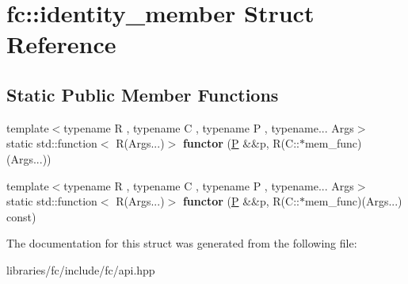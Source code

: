 \hypertarget{structfc_1_1identity__member}{}\section{fc\+:\+:identity\+\_\+member Struct Reference}
\label{structfc_1_1identity__member}
\subsection*{Static Public Member Functions}
\begin{DoxyCompactItemize}
\item 
\mbox{\label{structfc_1_1identity__member_a81c6dedaa5bfdc544e8699e746391e53}} 
{\footnotesize template$<$typename R , typename C , typename P , typename... Args$>$ }\\static std\+::function$<$ R(Args...)$>$ {\bfseries functor} (\mbox{\hyperlink{struct_p}{P}} \&\&p, R(C\+::$\ast$mem\+\_\+func)(Args...))
\item 
\mbox{\label{structfc_1_1identity__member_a07ab396b3fee76e30cfca9ed79e40848}} 
{\footnotesize template$<$typename R , typename C , typename P , typename... Args$>$ }\\static std\+::function$<$ R(Args...)$>$ {\bfseries functor} (\mbox{\hyperlink{struct_p}{P}} \&\&p, R(C\+::$\ast$mem\+\_\+func)(Args...) const)
\end{DoxyCompactItemize}


The documentation for this struct was generated from the following file\+:\begin{DoxyCompactItemize}
\item 
libraries/fc/include/fc/api.\+hpp\end{DoxyCompactItemize}
